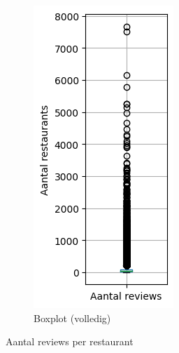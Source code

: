 \begin{figure}[H]
\begin{subfigure}{.25\textwidth}
        \includegraphics[width=1\linewidth]{fig/chapt3/boxplot_aantal_reviews_per_restaurant.png}
        \caption{Boxplot (volledig)}
        \label{fig:chapt3_boxplot_aantal_reviews_per_restaurant}
    \end{subfigure}
    \caption{Aantal reviews per restaurant}
    \label{fig:chapt3_aantal_reviews_per_restauant_combined}
\end{figure}



